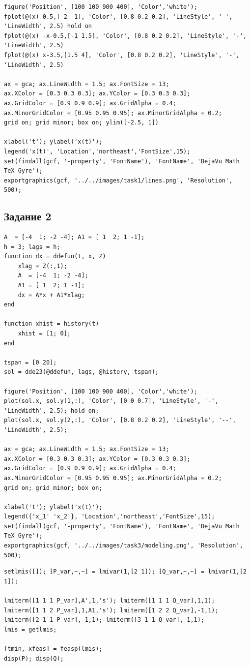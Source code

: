 \documentclass[a4paper,12pt]{article}
\begin{document}
	\begin{lstlisting}[caption={Построение графика}]
figure('Position', [100 100 900 400], 'Color','white');
fplot(@(x) 0.5,[-2 -1], 'Color', [0.8 0.2 0.2], 'LineStyle', '-', 'LineWidth', 2.5) hold on
fplot(@(x) -x-0.5,[-1 1.5], 'Color', [0.8 0.2 0.2], 'LineStyle', '-', 'LineWidth', 2.5)
fplot(@(x) x-3.5,[1.5 4], 'Color', [0.8 0.2 0.2], 'LineStyle', '-', 'LineWidth', 2.5)

ax = gca; ax.LineWidth = 1.5; ax.FontSize = 13;
ax.XColor = [0.3 0.3 0.3]; ax.YColor = [0.3 0.3 0.3];
ax.GridColor = [0.9 0.9 0.9]; ax.GridAlpha = 0.4;
ax.MinorGridColor = [0.95 0.95 0.95]; ax.MinorGridAlpha = 0.2;
grid on; grid minor; box on; ylim([-2.5, 1])

xlabel('t'); ylabel('x(t)');
legend('x(t)', 'Location','northeast','FontSize',15);
set(findall(gcf, '-property', 'FontName'), 'FontName', 'DejaVu Math TeX Gyre');
exportgraphics(gcf, '../../images/task1/lines.png', 'Resolution', 500);
\end{lstlisting}

	\newpage
	\subsection*{Задание 2}
	
\begin{lstlisting}[caption={Моделирование системы}]
A  = [-4  1; -2 -4]; A1 = [ 1  2; 1 -1];
h = 3; lags = h;
function dx = ddefun(t, x, Z)
	xlag = Z(:,1);
	A  = [-4  1; -2 -4];
	A1 = [ 1  2; 1 -1];
	dx = A*x + A1*xlag;
end

function xhist = history(t)
	xhist = [1; 0]; 
end

tspan = [0 20];
sol = dde23(@ddefun, lags, @history, tspan);

figure('Position', [100 100 900 400], 'Color','white');
plot(sol.x, sol.y(1,:), 'Color', [0 0 0.7], 'LineStyle', '-', 'LineWidth', 2.5); hold on;
plot(sol.x, sol.y(2,:), 'Color', [0.8 0.2 0.2], 'LineStyle', '--', 'LineWidth', 2.5);

ax = gca; ax.LineWidth = 1.5; ax.FontSize = 13; 
ax.XColor = [0.3 0.3 0.3]; ax.YColor = [0.3 0.3 0.3];
ax.GridColor = [0.9 0.9 0.9]; ax.GridAlpha = 0.4;
ax.MinorGridColor = [0.95 0.95 0.95]; ax.MinorGridAlpha = 0.2;
grid on; grid minor; box on; 

xlabel('t'); ylabel('x(t)');
legend({'x_1' 'x_2'}, 'Location','northeast','FontSize',15);
set(findall(gcf, '-property', 'FontName'), 'FontName', 'DejaVu Math TeX Gyre');
exportgraphics(gcf, '../../images/task3/modeling.png', 'Resolution', 500);
\end{lstlisting}

\begin{lstlisting}[caption={Решение LMI}]
setlmis([]); [P_var,~,~] = lmivar(1,[2 1]); [Q_var,~,~] = lmivar(1,[2 1]);

lmiterm([1 1 1 P_var],A',1,'s'); lmiterm([1 1 1 Q_var],1,1); 
lmiterm([1 1 2 P_var],1,A1,'s'); lmiterm([1 2 2 Q_var],-1,1);
lmiterm([2 1 1 P_var],-1,1); lmiterm([3 1 1 Q_var],-1,1);
lmis = getlmis;

[tmin, xfeas] = feasp(lmis);
disp(P); disp(Q);
\end{lstlisting}
	
\end{document}
